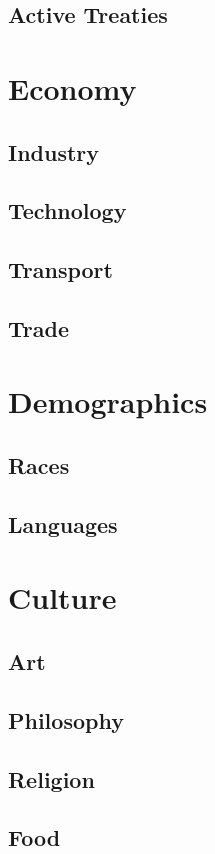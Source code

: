 \documentclass[11pt]{article}
\begin{document}
\subsection{Active Treaties}
\label{sec:orgdbf48a2}
\section{Economy}
\label{sec:org512ea7b}
\subsection{Industry}
\label{sec:orgceb1c9d}
\subsection{Technology}
\label{sec:org70358be}
\subsection{Transport}
\label{sec:org34af00f}
\subsection{Trade}
\label{sec:org8962678}
\section{Demographics}
\label{sec:org07c9506}
\subsection{Races}
\label{sec:org90e5d67}
\subsection{Languages}
\label{sec:orga649288}
\section{Culture}
\label{sec:org3e12321}
\subsection{Art}
\label{sec:orgfad0d51}
\subsection{Philosophy}
\label{sec:org9c49a8f}
\subsection{Religion}
\label{sec:org7243035}
\subsection{Food}
\label{sec:org20fd693}
\end{document}
